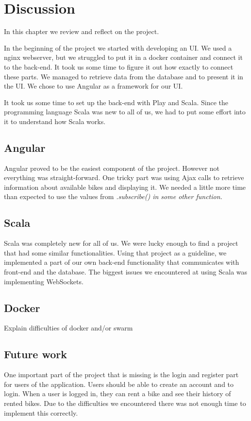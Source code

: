 \section{Discussion}

In this chapter we review and reflect on the project.

In the beginning of the project we started with developing an UI. We used a nginx webserver, but we struggled to put it in a docker container and connect it to the back-end. It took us some time to figure it out how exactly to connect these parts. We managed to retrieve data from the database and to present it in the UI. We chose to use Angular as a framework for our UI.

It took us some time to set up the back-end with Play and Scala. Since the programming language Scala was new to all of us, we had to put some effort into it to understand how Scala works.
\subsection{Angular}
Angular proved to be the easiest component of the project.  However not everything was straight-forward. One tricky part was using Ajax calls to retrieve information about available bikes and displaying it. We needed a little more time than expected to use the values from \it{.subscribe()} in some other function.
\subsection{Scala}
Scala was completely new for all of us. We were lucky enough to find a project that had some similar functionalities. Using that project as a guideline, we implemented a part of our own back-end functionality that communicates with front-end and the database. The biggest issues we encountered at using Scala was implementing WebSockets.
\subsection{Docker}
Explain difficulties of docker and/or swarm

\subsection{Future work}
One important part of the project that is missing is the login and register part for users of the application. Users should be able to create an account and to login. When a user is logged in, they can rent a bike and see their history of rented bikes. Due to the difficulties we encountered there was not enough time to implement this correctly.
